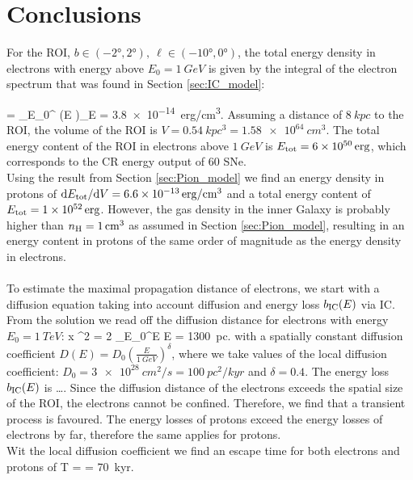 \section{Conclusions}

For the ROI, $b \in (\ang{-2},\ang{2}),\ \ell \in (\ang{-10},\ang{0})$, the total energy density in electrons with energy above $E_0 = \SI{1}{GeV}$ is given by the integral of the electron spectrum that was found in Section \ref{sec:IC_model}:

\be
{} = \int_{E_0}^{\infty} \left(E \right)_\el \de E = \SI{3.8e-14}{erg/cm^3}.
\ee
Assuming a distance of $\SI{8}{kpc}$ to the ROI, the volume of the ROI is $V = \SI{0.54}{kpc^3} = \SI{1.58e64}{cm^3}$. The total energy content of the ROI in electrons above $\SI{1}{GeV}$ is $E_{\text{tot}} = \SI{6e50}{erg}$, which corresponds to the CR energy output of $60$ SNe.\\
Using the result from Section \ref{sec:Pion_model} we find an energy density in protons of $\text{d} E_{\text{tot}} / \text{d} V = \SI{6.6e-13}{erg/cm^3}$ and a total energy content of $E_{\text{tot}} = \SI{1e52}{erg}$. However, the gas density in the inner Galaxy is probably higher than $n_{\text{H}} = \SI{1}{/cm^3}$ as assumed in Section \ref{sec:Pion_model}, resulting in an energy content in protons of the same order of magnitude as the energy density in electrons. \\
\\
To estimate the maximal propagation distance of electrons, we start with a diffusion equation taking into account diffusion and energy loss $b_{\text{IC}}(E)$ via IC. From the solution we read off the diffusion distance for electrons with energy $E_0 = \SI{1}{TeV}$:
\be
\langle x \rangle^2 = 2 \int_{E_0}^E \de E = \SI{1300}{pc}.
\ee
with a spatially constant diffusion coefficient $D(E) = D_0\left(\frac{E}{\SI{1}{GeV}}\right)^\delta$, where we take values of the local diffusion coefficient: $D_0 = \SI{3e28}{cm^2/s} = \SI{100}{pc^2/kyr}$ and $\delta = 0.4$. The energy loss $b_{\text{IC}}(E)$ is \dots. Since the diffusion distance of the electrons exceeds the spatial size of the ROI, the electrons cannot be confined. Therefore, we find that a transient process is favoured. The energy losses of protons exceed the energy losses of electrons by far, therefore the same applies for protons.\\
Wit the local diffusion coefficient we find an escape time for both electrons and protons of 
\be
T =  = \SI{70}{kyr}.
\ee

